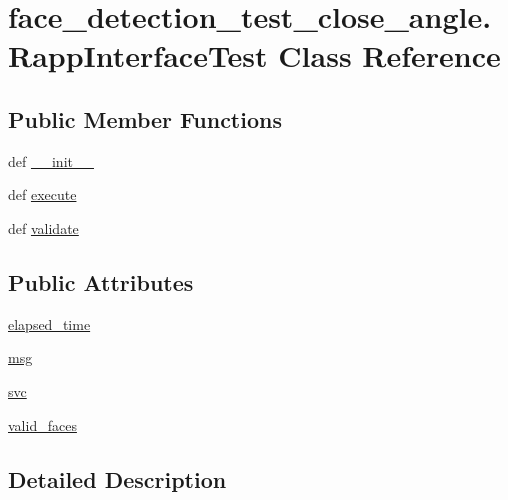 \hypertarget{classface__detection__test__close__angle_1_1RappInterfaceTest}{\section{face\-\_\-detection\-\_\-test\-\_\-close\-\_\-angle.\-Rapp\-Interface\-Test Class Reference}
\label{classface__detection__test__close__angle_1_1RappInterfaceTest}
}
\subsection*{Public Member Functions}
\begin{DoxyCompactItemize}
\item 
def \hyperlink{classface__detection__test__close__angle_1_1RappInterfaceTest_a71369607f443c18d24421609441f4ee8}{\-\_\-\-\_\-init\-\_\-\-\_\-}
\item 
def \hyperlink{classface__detection__test__close__angle_1_1RappInterfaceTest_a2e1d984366226c08116d462c3d717582}{execute}
\item 
def \hyperlink{classface__detection__test__close__angle_1_1RappInterfaceTest_a4751fdff889b779285885d37861a4d24}{validate}
\end{DoxyCompactItemize}
\subsection*{Public Attributes}
\begin{DoxyCompactItemize}
\item 
\hyperlink{classface__detection__test__close__angle_1_1RappInterfaceTest_a6efac6774f7a57caeab7fbe3adc2abc6}{elapsed\-\_\-time}
\item 
\hyperlink{classface__detection__test__close__angle_1_1RappInterfaceTest_afe2472e495c74496cb7ad9b640a70fd5}{msg}
\item 
\hyperlink{classface__detection__test__close__angle_1_1RappInterfaceTest_a9b7f4440d9c6b512cb4029aac6ba8de7}{svc}
\item 
\hyperlink{classface__detection__test__close__angle_1_1RappInterfaceTest_af862bf3dc27ad26cc3a8683d1ad00173}{valid\-\_\-faces}
\end{DoxyCompactItemize}


\subsection{Detailed Description}


